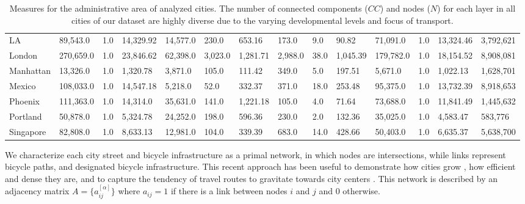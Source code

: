 \begin{table}[th!]
\begin{adjustbox}{width=\textwidth,keepaspectratio}
\begin{tabular}{llllllllllllll}
      LA         & 89,543.0                 & 1.0                      & 14,329.92                & 14,577.0                  & 230.0      & 653.16     & 173.0   & 9.0  & 90.82      & 71,091.0  & 1.0  & 13,324.46                      & 3,792,621  \\
      London     & 270,659.0                & 1.0                      & 23,846.62                & 62,398.0                  & 3,023.0    & 1,281.71   & 2,988.0 & 38.0 & 1,045.39   & 179,782.0 & 1.0  & 18,154.52                      & 8,908,081  \\
      Manhattan  & 13,326.0                 & 1.0                      & 1,320.78                 & 3,871.0                   & 105.0      & 111.42     & 349.0   & 5.0  & 197.51     & 5,671.0   & 1.0  & 1,022.13                       & 1,628,701  \\
      Mexico     & 108,033.0                & 1.0                      & 14,547.18                & 5,218.0                   & 52.0       & 332.37     & 371.0   & 18.0 & 253.48     & 95,375.0  & 1.0  & 13,732.39                      & 8,918,653  \\
      Phoenix    & 111,363.0                & 1.0                      & 14,314.0                 & 35,631.0                  & 141.0      & 1,221.18   & 105.0   & 4.0  & 71.64      & 73,688.0  & 1.0  & 11,841.49                      & 1,445,632  \\
      Portland   & 50,878.0                 & 1.0                      & 5,324.78                 & 24,252.0                  & 198.0      & 596.36     & 230.0   & 2.0  & 132.36     & 35,025.0  & 1.0  & 4,583.47                       & 583,776    \\
      Singapore  & 82,808.0                 & 1.0                      & 8,633.13                 & 12,981.0                  & 104.0      & 339.39     & 683.0   & 14.0 & 428.66     & 50,403.0  & 1.0  & 6,635.37                       & 5,638,700  \\
      \bottomrule
    \end{tabular}
  \end{adjustbox}
  \caption[Measures for analyzed cities]{Measures for the administrative area of analyzed cities. The number of connected components ($CC$) and nodes ($N$) for each layer in all cities of our dataset are highly diverse due to the varying developmental levels and focus of transport.
    \label{tab:DataDrivenCities}}
\end{table}

We characterize each city street and bicycle infrastructure as a primal network, \cite{porta2006primal} in which nodes are intersections, while links represent bicycle paths, and designated bicycle infrastructure. This recent approach has been useful to demonstrate how cities grow \cite{strano2012evolution,Barthelemy2013Evolution}, how efficient \cite{Gallotti2014Efficiency} and dense they are, and to capture the tendency of travel routes to gravitate towards city centers \cite{Lee2017Morphology}. This network is described by an adjacency matrix $A=\{a_{ij}^{[\alpha]}\}$ where $a_{ij}=1$ if there is a link between nodes $i$ and $j$ and 0 otherwise.

